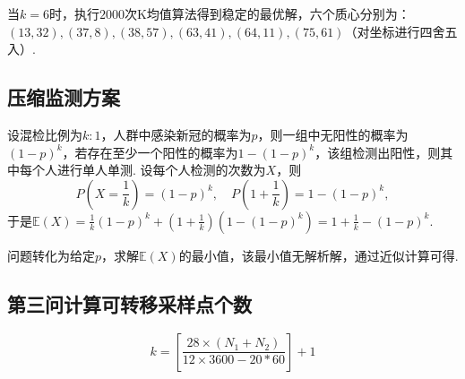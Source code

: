 \documentclass[12pt, a4paper, oneside]{ctexart}
\def\E{\mathbb{E}}          %
\begin{document}
当$k=6$时，执行$2000$次K均值算法得到稳定的最优解，六个质心分别为：\\$(13, 32), (37, 8), (38, 57), (63, 41), (64, 11), (75, 61)$（对坐标进行四舍五入）.

\subsection*{压缩监测方案}
设混检比例为$k:1$，人群中感染新冠的概率为$p$，则一组中无阳性的概率为$(1-p)^k$，若存在至少一个阳性的概率为$1-(1-p)^k$，该组检测出阳性，则其中每个人进行单人单测. 设每个人检测的次数为$X$，则
\begin{equation*}
    P(X = \frac{1}{k}) = (1-p)^k,\quad P(1+\frac{1}{k})=1-(1-p)^k,
\end{equation*}
于是$\E(X) = \frac{1}{k}(1-p)^k+\left(1+\frac{1}{k}\right)(1-(1-p)^k)=1+\frac{1}{k}-(1-p)^k$.

问题转化为给定$p$，求解$\E(X)$的最小值，该最小值无解析解，通过近似计算可得.

\subsection*{第三问计算可转移采样点个数}
\begin{equation*}
    k=\left[\frac{28\times(N_1+N_2)}{12\times3600-20*60}\right]+1
\end{equation*}

\iffalse
\centerline{
    \texttt{[image: figure.png]}
}
\renewcommand\arraystretch{0.8} %
\begin{table}[!htbp] %
    \centering %
    \begin{tabular}{p{1cm}<{\centering}p{1cm}<{\centering}p{3cm}<{\centering}p{5cm}<{\centering}} %
        \toprule
        $x_i$ & $f[x_1]$ & $f[x_i,x_{i+1}]$ & $f[x_i,x_{i+1},x_{i+2}]$ \\
        \midrule
        $x_0$ & $f(x_0)$ &                  &                          \\
        $x_0$ & $f(x_0)$ & $f'(x_0)$        &                          \\
        $x_0$ & $f(x_1)$ & $\frac{f(x_1)-f(x_0)}{x_1-x_0}$ & $\frac{f(x_1)-f(x_0)}{(x_1-x_0)^2}-\frac{f'(x_0)}{x_1-x_0}$\\
        \bottomrule
    \end{tabular}
\end{table}

\def\Log{\text{Log}} %
$\Log$ %
\fi
\end{document}
